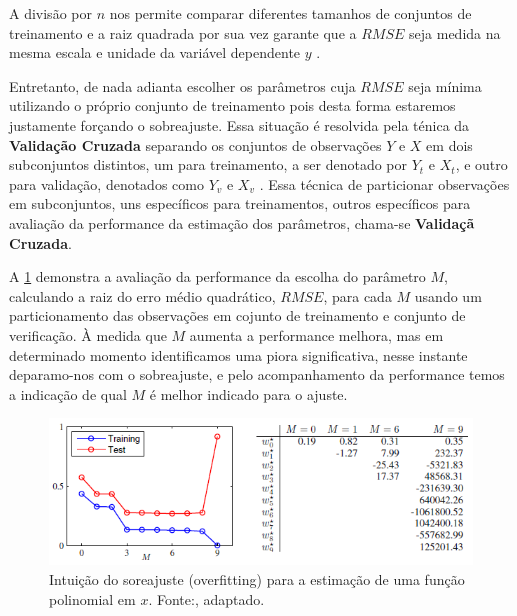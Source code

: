 A divisão por $ n $ nos permite comparar diferentes tamanhos de conjuntos de treinamento e a raiz quadrada por sua vez garante que a $ RMSE $ seja medida na mesma escala e unidade da variável dependente $ y $ \cite[p.7]{Bishop}. 

Entretanto, de nada adianta escolher os parâmetros cuja $ RMSE $ seja mínima utilizando o próprio conjunto de treinamento pois desta forma estaremos justamente forçando o sobreajuste. Essa situação é resolvida pela ténica da \textbf{Validação Cruzada} separando os conjuntos de observações $ Y $ e $ X $ em dois subconjuntos distintos, um para treinamento, a ser denotado por $ Y_t $ e $ X_t $, e outro para validação, denotados como $ Y_v $ e $ X_v $ \cite[p.32]{Bishop}.  Essa técnica de particionar observações em subconjuntos, uns específicos para treinamentos, outros específicos para avaliação da performance da estimação dos parâmetros, chama-se \textbf{Validaçã Cruzada}.                                                                                                                                                                                                                                                                                                                                                                                                                                                                                                                                                                                                                                                                                                                                  

A \cref{fig:bishop_overfit_error} demonstra a avaliação da performance da escolha do parâmetro $ M $, calculando a raiz do erro médio quadrático, $ RMSE $, para cada $ M $ usando um particionamento das observações em cojunto de treinamento e conjunto de verificação. À medida que $ M $ aumenta a performance melhora, mas em determinado momento identificamos uma piora significativa, nesse instante deparamo-nos com o sobreajuste, e pelo acompanhamento da performance temos a indicação de qual $ M $ é melhor indicado para o ajuste. 

\begin{figure}[h!]
\centering
\includegraphics[width=1\linewidth]{img/bishop_overfit_error}
\caption[Intuição do sobreajuste (overfitting)]{Intuição do soreajuste (overfitting) para a estimação de uma função polinomial em $x$. Fonte:\cite[p.8]{Bishop}, adaptado.}
\label{fig:bishop_overfit_error}
\end{figure}


